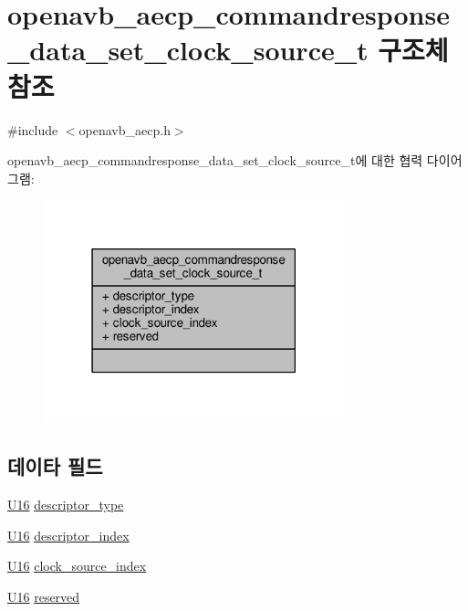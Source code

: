 \hypertarget{structopenavb__aecp__commandresponse__data__set__clock__source__t}{}\section{openavb\+\_\+aecp\+\_\+commandresponse\+\_\+data\+\_\+set\+\_\+clock\+\_\+source\+\_\+t 구조체 참조}
\label{structopenavb__aecp__commandresponse__data__set__clock__source__t}


{\ttfamily \#include $<$openavb\+\_\+aecp.\+h$>$}



openavb\+\_\+aecp\+\_\+commandresponse\+\_\+data\+\_\+set\+\_\+clock\+\_\+source\+\_\+t에 대한 협력 다이어그램\+:
\nopagebreak
\begin{figure}[H]
\begin{center}
\leavevmode
\includegraphics[width=247pt]{structopenavb__aecp__commandresponse__data__set__clock__source__t__coll__graph}
\end{center}
\end{figure}
\subsection*{데이타 필드}
\begin{DoxyCompactItemize}
\item 
\hyperlink{openavb__types__base__pub_8h_a0a0a322d5fa4a546d293a77ba8b4a71f}{U16} \hyperlink{structopenavb__aecp__commandresponse__data__set__clock__source__t_a1e231d7874aada5925b29affc76782cc}{descriptor\+\_\+type}
\item 
\hyperlink{openavb__types__base__pub_8h_a0a0a322d5fa4a546d293a77ba8b4a71f}{U16} \hyperlink{structopenavb__aecp__commandresponse__data__set__clock__source__t_ab26fb363c24b9a2a4391f9171c981b08}{descriptor\+\_\+index}
\item 
\hyperlink{openavb__types__base__pub_8h_a0a0a322d5fa4a546d293a77ba8b4a71f}{U16} \hyperlink{structopenavb__aecp__commandresponse__data__set__clock__source__t_ab8a3ce0c7efc03bc176997db162ad53f}{clock\+\_\+source\+\_\+index}
\item 
\hyperlink{openavb__types__base__pub_8h_a0a0a322d5fa4a546d293a77ba8b4a71f}{U16} \hyperlink{structopenavb__aecp__commandresponse__data__set__clock__source__t_ac15a687d635cc969d1bfab4d96858b77}{reserved}
\end{DoxyCompactItemize}



